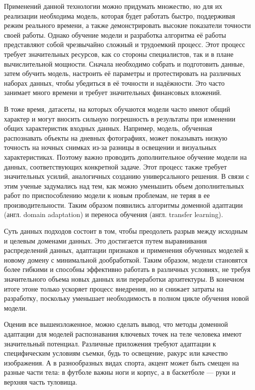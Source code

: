 \hfill \break
Применений данной технологии можно придумать множество, но для их реализации необходима модель, которая будет работать быстро, поддерживая режим реального времени, а также демонстрировать высокие показатели точности своей работы. Однако обучение модели и разработка алгоритма её работы представляют собой чрезвычайно сложный и трудоемкий процесс. Этот процесс требует значительных ресурсов, как со стороны специалистов, так и в плане вычислительной мощности. Сначала необходимо собрать и подготовить данные, затем обучить модель, настроить её параметры и протестировать на различных наборах данных, чтобы убедиться в её точности и надёжности. Это часто занимает много времени и требует значительных финансовых вложений. 

В тоже время, датасеты, на которых обучаются модели часто имеют общий характер и могут вносить сильную погрешность в результаты при изменении общих характеристик входных данных. Например, модель, обученная распознавать объекты на дневных фотографиях, может показывать низкую точность на ночных снимках из-за разницы в освещении и визуальных характеристиках. Поэтому важно проводить дополнительное обучение модели на данных, соответствующих конкретной задаче. Этот процесс также требует значительных усилий, аналогичных созданию универсального решения. В связи с этим ученые задумались над тем, как можно уменьшить объем дополнительных работ по приспособлению модели к новым проблемам, не теряя в ее производительности. Таким образом появились алгоритмы доменной адаптации (англ. domain adaptation) и переноса обучения (англ. transfer learning).

Суть данных подходов состоит в том, чтобы преодолеть разрыв между исходным и целевым доменами данных. Это достигается путем выравнивания распределений данных, адаптации признаков и применения обученных моделей к новому домену с минимальной дообработкой. Таким образом, модели становятся более гибкими и способны эффективно работать в различных условиях, не требуя значительного объема новых данных или переработки архитектуры. В конечном итоге этоне только ускоряет процесс внедрения, но и снижает затраты на разработку, поскольку уменьшает необходимость в полном цикле обучения новой модели.

\hfill \break

Оценив все вышеизложенное, можно сделать вывод, что методы доменной адаптации для моделей распознавания ключевых точек на теле человека имеют значительный потенциал. Различные приложения требуют адаптации к специфическим условиям съемки, будь то освещение, ракурс или качество изображения. А в разнообразных видах спорта, акцент может быть смещен на разные части тела: в футболе важны ноги и корпус, а в баскетболе — руки и верхняя часть туловища. 

